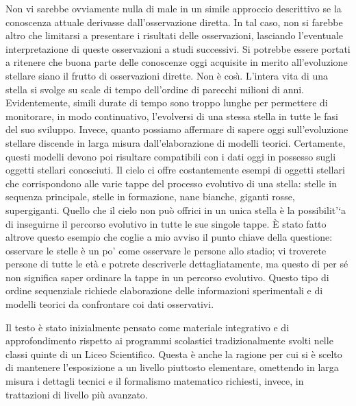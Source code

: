 Non vi sarebbe ovviamente nulla di male in un simile approccio descrittivo se la
conoscenza attuale derivasse dall'osservazione diretta. In tal caso, non si
farebbe altro che limitarsi a presentare i risultati delle osservazioni,
lasciando l'eventuale interpretazione di queste osservazioni a studi successivi.
Si potrebbe essere portati a ritenere che buona parte delle conoscenze oggi
acquisite in merito all'evoluzione stellare siano il frutto di osservazioni
dirette. Non \`e cos\`{\i}{}. L'intera vita di una stella si svolge su scale di
tempo dell'ordine di parecchi milioni di anni. Evidentemente, simili durate di
tempo sono troppo lunghe per permettere di monitorare, in modo continuativo,
l'evolversi di una stessa stella in tutte le fasi del suo sviluppo. Invece,
quanto possiamo affermare di sapere oggi sull'evoluzione stellare discende in
larga misura dall'elaborazione di modelli teorici. Certamente, questi modelli
devono poi risultare compatibili con i dati oggi in possesso sugli oggetti
stellari conosciuti.  Il cielo ci offre costantemente esempi di oggetti stellari
che corrispondono alle varie tappe del processo evolutivo di una stella: stelle
in sequenza principale, stelle in formazione, nane bianche, giganti rosse,
supergiganti.  Quello che il cielo non pu\`o offrici in un unica stella \`e la
possibilit'`a di inseguirne il percorso evolutivo in tutte le sue singole tappe.
\`E stato fatto altrove questo esempio che coglie a mio avviso il punto chiave
della questione: osservare le stelle \`e un po' come osservare le persone allo
stadio; vi troverete persone di tutte le et\`a e potrete descriverle
dettagliatamente, ma questo di per s\'e non significa saper ordinare la tappe in
un percorso evolutivo. Questo tipo di ordine sequenziale richiede elaborazione
delle informazioni sperimentali e di modelli teorici da confrontare coi dati
osservativi.

Il testo \`e stato inizialmente pensato come materiale integrativo e di
approfondimento rispetto ai programmi scolastici tradizionalmente svolti nelle
classi quinte di un Liceo Scientifico.  Questa \`e anche la ragione per cui si
\`e scelto di mantenere l'esposizione a un livello piuttosto elementare,
omettendo in larga misura i dettagli tecnici e il formalismo matematico
richiesti, invece, in trattazioni di livello pi\`u avanzato.


